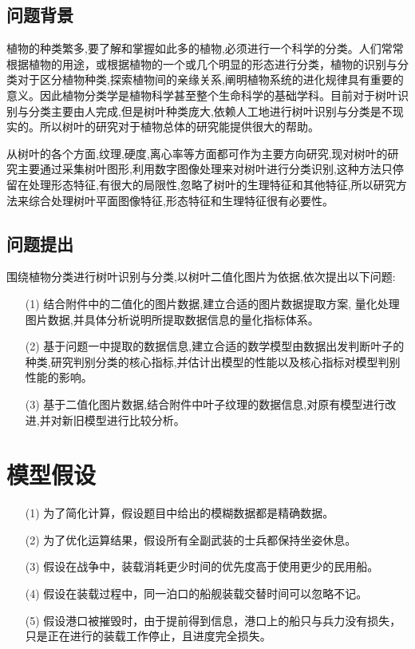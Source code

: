 \documentclass{whutmod}
\begin{document}
	\subsection{问题背景}
    植物的种类繁多,要了解和掌握如此多的植物,必须进行一个科学的分类。人们常常根据植物的用途，或根据植物的一个或几个明显的形态进行分类，植物的识别与分类对于区分植物种类,探索植物间的亲缘关系,阐明植物系统的进化规律具有重要的意义。因此植物分类学是植物科学甚至整个生命科学的基础学科。目前对于树叶识别与分类主要由人完成,但是树叶种类庞大,依赖人工地进行树叶识别与分类是不现实的。所以树叶的研究对于植物总体的研究能提供很大的帮助。
    
    从树叶的各个方面,纹理,硬度,离心率等方面都可作为主要方向研究,现对树叶的研究主要通过采集树叶图形,利用数字图像处理来对树叶进行分类识别,这种方法只停留在处理形态特征,有很大的局限性,忽略了树叶的生理特征和其他特征,所以研究方法来综合处理树叶平面图像特征,形态特征和生理特征很有必要性。
    
    

	\subsection{问题提出}
    围绕植物分类进行树叶识别与分类,以树叶二值化图片为依据,依次提出以下问题:
		 
	\begin{itemize}
	\item [(1)] 结合附件中的二值化的图片数据,建立合适的图片数据提取方案, 量化处理图片数据,并具体分析说明所提取数据信息的量化指标体系。
	\item [(2)] 基于问题一中提取的数据信息,建立合适的数学模型由数据出发判断叶子的种类,研究判别分类的核心指标,并估计出模型的性能以及核心指标对模型判别性能的影响。
	\item [(3)] 基于二值化图片数据,结合附件中叶子纹理的数据信息,对原有模型进行改进,并对新旧模型进行比较分析。
	\end{itemize}
	
	\section{模型假设}
	\begin{itemize}                                             
		\item [(1)] 为了简化计算，假设题目中给出的模糊数据都是精确数据。
		\item [(2)] 为了优化运算结果，假设所有全副武装的士兵都保持坐姿休息。
		\item [(3)] 假设在战争中，装载消耗更少时间的优先度高于使用更少的民用船。
		\item [(4)] 假设在装载过程中，同一泊口的船舰装载交替时间可以忽略不记。
		\item [(5)] 假设港口被摧毁时，由于提前得到信息，港口上的船只与兵力没有损失，只是正在进行的装载工作停止，且进度完全损失。
	\end{itemize}
	
\end{document}
